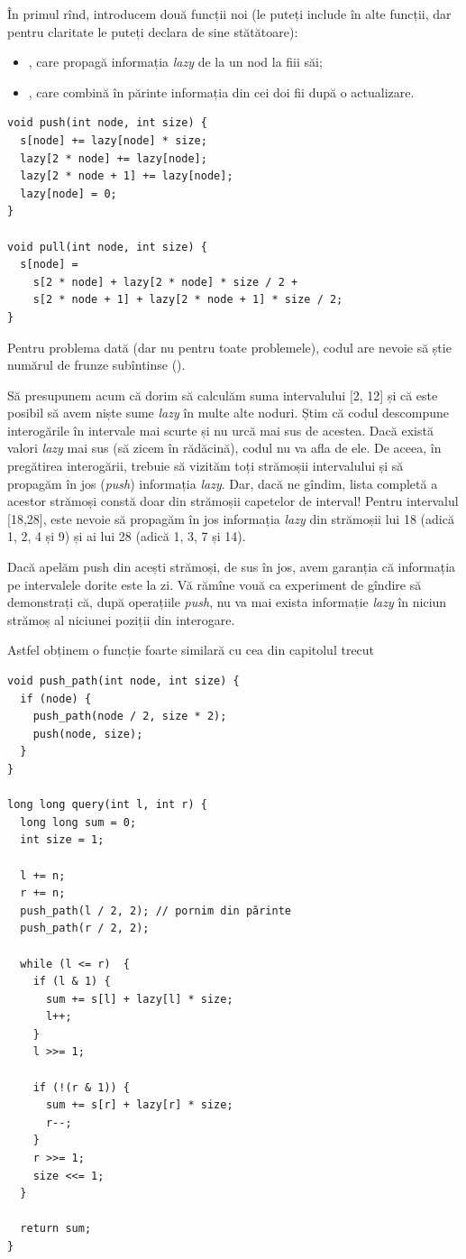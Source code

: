 \documentclass[../main.tex]{subfiles}
\begin{document}
În primul rînd, introducem două funcții noi (le puteți include în alte funcții, dar pentru claritate le puteți declara de sine stătătoare):

\begin{itemize}
  \item {}, care propagă informația \textit{lazy} de la un nod la fiii săi;
  \item {}, care combină în părinte informația din cei doi fii după o actualizare.
\end{itemize}

\begin{verbatim}
void push(int node, int size) {
  s[node] += lazy[node] * size;
  lazy[2 * node] += lazy[node];
  lazy[2 * node + 1] += lazy[node];
  lazy[node] = 0;
}

void pull(int node, int size) {
  s[node] =
    s[2 * node] + lazy[2 * node] * size / 2 +
    s[2 * node + 1] + lazy[2 * node + 1] * size / 2;
}
\end{verbatim}

Pentru problema dată (dar nu pentru toate problemele), codul are nevoie să știe numărul de frunze subîntinse ().

Să presupunem acum că dorim să calculăm suma intervalului [2, 12] și că este posibil să avem niște sume \textit{lazy} în multe alte noduri. Știm că codul descompune interogările în intervale mai scurte și nu urcă mai sus de acestea. Dacă există valori \textit{lazy} mai sus (să zicem în rădăcină), codul nu va afla de ele. De aceea, în pregătirea interogării, trebuie să vizităm toți strămoșii intervalului și să propagăm în jos (\textit{push}) informația \textit{lazy}. Dar, dacă ne gîndim, lista completă a acestor strămoși constă doar din strămoșii capetelor de interval! Pentru intervalul [18,28], este nevoie să propagăm în jos informația \textit{lazy} din strămoșii lui 18 (adică 1, 2, 4 și 9) și ai lui 28 (adică 1, 3, 7 și 14).

Dacă apelăm push din acești strămoși, de sus în jos, avem garanția că informația pe intervalele dorite este la zi. Vă rămîne vouă ca experiment de gîndire să demonstrați că, după operațiile \textit{push}, nu va mai exista informație \textit{lazy} în niciun strămoș al niciunei poziții din interogare.

Astfel obținem o funcție foarte similară cu cea din capitolul trecut

\begin{verbatim}
void push_path(int node, int size) {
  if (node) {
    push_path(node / 2, size * 2);
    push(node, size);
  }
}

long long query(int l, int r) {
  long long sum = 0;
  int size = 1;

  l += n;
  r += n;
  push_path(l / 2, 2); // pornim din părinte
  push_path(r / 2, 2);

  while (l <= r)  {
    if (l & 1) {
      sum += s[l] + lazy[l] * size;
      l++;
    }
    l >>= 1;

    if (!(r & 1)) {
      sum += s[r] + lazy[r] * size;
      r--;
    }
    r >>= 1;
    size <<= 1;
  }

  return sum;
}
\end{verbatim}
\end{document}
